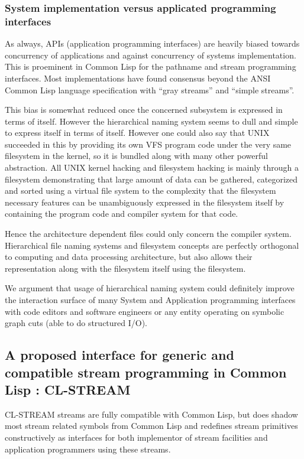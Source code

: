 \documentclass[sigconf]{acmart}
\begin{document}
\subsubsection{System implementation versus applicated programming interfaces}
As always, APIs (application programming interfaces) are heavily biased towards concurrency of applications and against concurrency of systems implementation. This is proeminent in Common Lisp for the pathname and stream programming interfaces. Most implementations have found consensus beyond the ANSI Common Lisp language specification with ``gray streams'' and ``simple streams''.

This bias is somewhat reduced once the concerned subsystem is expressed in terms of itself. However the hierarchical naming system seems to dull and simple to express itself in terms of itself. However one could also say that UNIX succeeded in this by providing its own VFS program code under the very same filesystem in the kernel, so it is bundled along with many other powerful abstraction. All UNIX kernel hacking and filesystem hacking is mainly through a filesystem demonstrating that large amount of data can be gathered, categorized and sorted using a virtual file system to the complexity that the filesystem necessary features can be unambiguously expressed in the filesystem itself by containing the program code and compiler system for that code.

Hence the architecture dependent files could only concern the compiler system. Hierarchical file naming systems and filesystem concepts are perfectly orthogonal to computing and data processing architecture, but also allows their representation along with the filesystem itself using the filesystem.

We argument that usage of hierarchical naming system could definitely improve the interaction surface of many System and Application programming interfaces with code editors and software engineers or any entity operating on symbolic graph cuts (able to do structured I/O).


\subsection{A proposed interface for generic and compatible stream programming in Common Lisp : CL-STREAM}

CL-STREAM streams are fully compatible with Common Lisp, but does shadow most stream related symbols from Common Lisp and redefines stream primitives constructively as interfaces for both implementor of stream facilities and application programmers using these streams.
\end{document}
